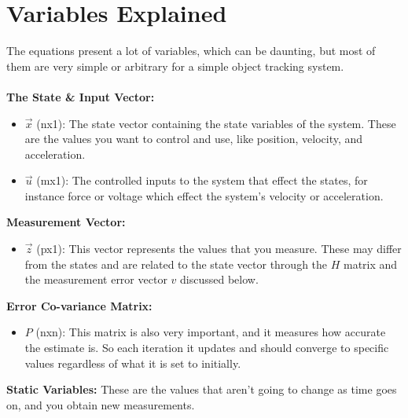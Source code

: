 \documentclass{article} %
\begin{document}
\section{Variables Explained}
The equations present a lot of variables, which can be daunting, but most of them are very simple or arbitrary for a simple object tracking system. \\\\
\textbf{The State \& Input Vector:}
\begin{itemize}
\item $\vec{x}$ (nx1): The state vector containing the state variables of the system. These are the values you want to control and use, like position, velocity, and acceleration. 
\item $\vec{u}$ (mx1): The controlled inputs to the system that effect the states, for instance force or voltage which effect the system's velocity or acceleration.
\end{itemize}
\textbf{Measurement Vector:}
\begin{itemize}
\item $\vec{z}$ (px1): This vector represents the values that you measure. These may differ from the states and are related to the state vector through the $H$ matrix and the measurement error vector $v$ discussed below.
\end{itemize}
\textbf{Error Co-variance Matrix:}
\begin{itemize}
\item $P$ (nxn): This matrix is also very important, and it measures how accurate the estimate is. So each iteration it updates and should converge to specific values regardless of what it is set to initially.
\end{itemize}
\textbf{Static Variables:}
These are the values that aren't going to change as time goes on, and you obtain new measurements. 
\end{document}
